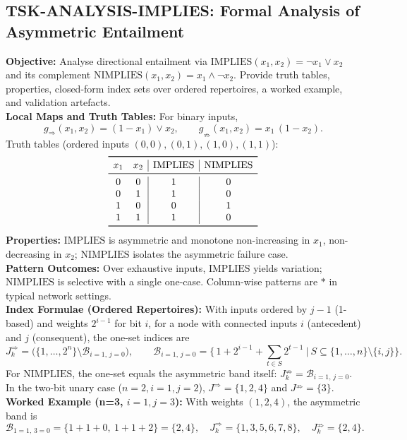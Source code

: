 \documentclass{article}
\begin{document}
\subsection{TSK-ANALYSIS-IMPLIES: Formal Analysis of Asymmetric Entailment}
\textbf{Objective:} Analyse directional entailment via \(\mathrm{IMPLIES}(x_1,x_2)=\neg x_1 \lor x_2\) and its complement \(\mathrm{NIMPLIES}(x_1,x_2)=x_1 \land \neg x_2\). Provide truth tables, properties, closed-form index sets over ordered repertoires, a worked example, and validation artefacts.\\
\textbf{Local Maps and Truth Tables:} For binary inputs,
\[
g_{\Rightarrow}(x_1,x_2) = (1-x_1) \lor x_2,\qquad g_{\nRightarrow}(x_1,x_2) = x_1\,(1-x_2).
\]
Truth tables (ordered inputs \((0,0),(0,1),(1,0),(1,1)\)):
\[
\begin{array}{cc|c|c}
\toprule
 x_1 & x_2 & \mathrm{IMPLIES} & \mathrm{NIMPLIES} \\
\midrule
 0 & 0 & 1 & 0 \\
 0 & 1 & 1 & 0 \\
 1 & 0 & 0 & 1 \\
 1 & 1 & 1 & 0 \\
\bottomrule
\end{array}
\]
\textbf{Properties:} \(\mathrm{IMPLIES}\) is asymmetric and monotone non-increasing in \(x_1\), non-decreasing in \(x_2\); \(\mathrm{NIMPLIES}\) isolates the asymmetric failure case.\\
\textbf{Pattern Outcomes:} Over exhaustive inputs, \(\mathrm{IMPLIES}\) yields variation; \(\mathrm{NIMPLIES}\) is selective with a single one-case. Column-wise patterns are \(*\) in typical network settings.\\
\textbf{Index Formulae (Ordered Repertoires):} With inputs ordered by \(j-1\) (1-based) and weights \(2^{i-1}\) for bit \(i\), for a node with connected inputs \(i\) (antecedent) and \(j\) (consequent), the one-set indices are
\[
J^{\Rightarrow}_k = \Big(\{1,\dots,2^n\}\setminus \mathcal{B}_{i=1,\,j=0}\Big),\qquad \mathcal{B}_{i=1,\,j=0}=\Big\{\,1+2^{i-1}+\sum_{t\in S}2^{t-1}\ \Big|\ S\subseteq\{1,\dots,n\}\setminus\{i,j\}\Big\}.
\]
For \(\mathrm{NIMPLIES}\), the one-set equals the asymmetric band itself: \(J^{\nRightarrow}_k=\mathcal{B}_{i=1,\,j=0}\). In the two-bit unary case (\(n=2, i=1, j=2\)), \(J^{\Rightarrow} = \{1,2,4\}\) and \(J^{\nRightarrow} = \{3\}\).\\
\textbf{Worked Example (n=3, \(i=1, j=3\)):} With weights \((1,2,4)\), the asymmetric band is
\[
\mathcal{B}_{1=1,\,3=0} = \{1+1+0,\ 1+1+2\} = \{2,4\},\quad J^{\Rightarrow}_k=\{1,3,5,6,7,8\},\quad J^{\nRightarrow}_k=\{2,4\}.
\]
\end{document}
